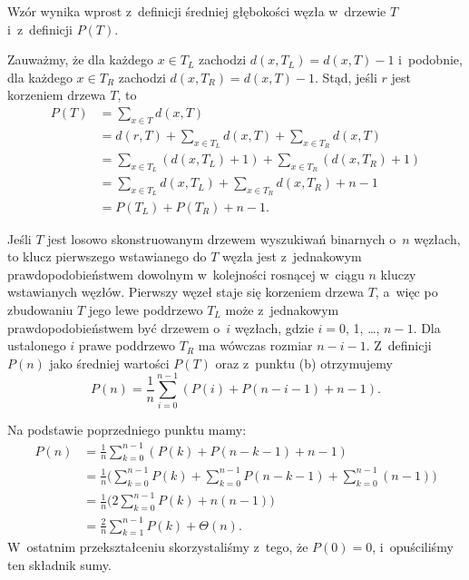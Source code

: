 \bignegskip

\subproblem %
Wzór wynika wprost z~definicji średniej głębokości węzła w~drzewie $T$ i~z~definicji $P(T)$.

\subproblem %
Zauważmy, że dla każdego $x\in T_L$ zachodzi $d(x,T_L)=d(x,T)-1$ i~podobnie, dla każdego $x\in T_R$ zachodzi $d(x,T_R)=d(x,T)-1$.
Stąd, jeśli $r$ jest korzeniem drzewa $T$, to
\begin{align*}
	P(T) &= \sum_{x\in T}d(x,T) \\
	&= d(r,T)+\sum_{x\in T_L}d(x,T)+\sum_{x\in T_R}d(x,T) \\[1mm]
	&= \sum_{x\in T_L}(d(x,T_L)+1)+\sum_{x\in T_R}(d(x,T_R)+1) \\[1mm]
	&= \sum_{x\in T_L}d(x,T_L)+\sum_{x\in T_R}d(x,T_R)+n-1 \\[1mm]
	&= P(T_L)+P(T_R)+n-1.
\end{align*}

\subproblem %
Jeśli $T$ jest losowo skonstruowanym drzewem wyszukiwań binarnych o~$n$ węzłach, to klucz pierwszego wstawianego do $T$ węzła jest z~jednakowym prawdopodobieństwem dowolnym w~kolejności rosnącej w~ciągu $n$ kluczy wstawianych węzłów.
Pierwszy węzeł staje się korzeniem drzewa $T$, a~więc po zbudowaniu $T$ jego lewe poddrzewo $T_L$ może z~jednakowym prawdopodobieństwem być drzewem o~$i$ węzłach, gdzie $i=0$, 1, \dots, $n-1$.
Dla ustalonego $i$ prawe poddrzewo $T_R$ ma wówczas rozmiar $n-i-1$.
Z~definicji $P(n)$ jako średniej wartości $P(T)$ oraz z~punktu (b) otrzymujemy
\[
	P(n) = \frac{1}{n}\sum_{i=0}^{n-1}(P(i)+P(n-i-1)+n-1).
\]

\subproblem %
Na podstawie poprzedniego punktu mamy:
\begin{align*}
	P(n) &= \frac{1}{n}\sum_{k=0}^{n-1}(P(k)+P(n-k-1)+n-1) \\
	&= \frac{1}{n}\biggl(\sum_{k=0}^{n-1}P(k)+\sum_{k=0}^{n-1}P(n-k-1)+\sum_{k=0}^{n-1}(n-1)\biggr) \\
	&= \frac{1}{n}\biggl(2\sum_{k=0}^{n-1}P(k)+n(n-1)\biggr) \\
	&= \frac{2}{n}\sum_{k=1}^{n-1}P(k)+\Theta(n).
\end{align*}
W~ostatnim przekształceniu skorzystaliśmy z~tego, że $P(0)=0$, i~opuściliśmy ten składnik sumy.

